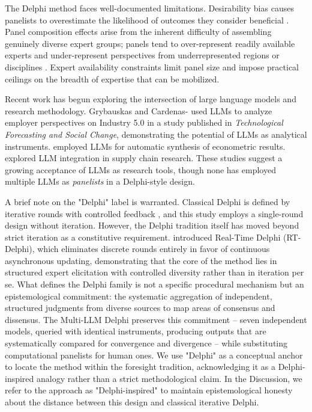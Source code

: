 \documentclass{article}
\begin{document}
The Delphi method faces well-documented limitations. Desirability bias causes panelists to overestimate the likelihood of outcomes they consider beneficial \citep{ecken2011desirability}. Panel composition effects arise from the inherent difficulty of assembling genuinely diverse expert groups; panels tend to over-represent readily available experts and under-represent perspectives from underrepresented regions or disciplines \citep{foerster2014delphipanel, sokolov2025delphias}. Expert availability constraints limit panel size and impose practical ceilings on the breadth of expertise that can be mobilized.

Recent work has begun exploring the intersection of large language models and research methodology. Grybauskas and Cardenas-\citet{rubio2024} used LLMs to analyze employer perspectives on Industry 5.0 in a study published in \textit{Technological Forecasting and Social Change}, demonstrating the potential of LLMs as analytical instruments. \citet{guo2026llmsynthesis} employed LLMs for automatic synthesis of econometric results. \citet{liu2026llmsupplychain} explored LLM integration in supply chain research. These studies suggest a growing acceptance of LLMs as research tools, though none has employed multiple LLMs as \textit{panelists} in a Delphi-style design.

A brief note on the "Delphi" label is warranted. Classical Delphi is defined by iterative rounds with controlled feedback \citep{linstone1975delphi}, and this study employs a single-round design without iteration. However, the Delphi tradition itself has moved beyond strict iteration as a constitutive requirement. \citet{gordon2006rtdelphi} introduced Real-Time Delphi (RT-Delphi), which eliminates discrete rounds entirely in favor of continuous asynchronous updating, demonstrating that the core of the method lies in structured expert elicitation with controlled diversity rather than in iteration per se. What defines the Delphi family is not a specific procedural mechanism but an epistemological commitment: the systematic aggregation of independent, structured judgments from diverse sources to map areas of consensus and dissensus. The Multi-LLM Delphi preserves this commitment -- seven independent models, queried with identical instruments, producing outputs that are systematically compared for convergence and divergence -- while substituting computational panelists for human ones. We use "Delphi" as a conceptual anchor to locate the method within the foresight tradition, acknowledging it as a Delphi-inspired analogy rather than a strict methodological claim. In the Discussion, we refer to the approach as "Delphi-inspired" to maintain epistemological honesty about the distance between this design and classical iterative Delphi.
\end{document}
